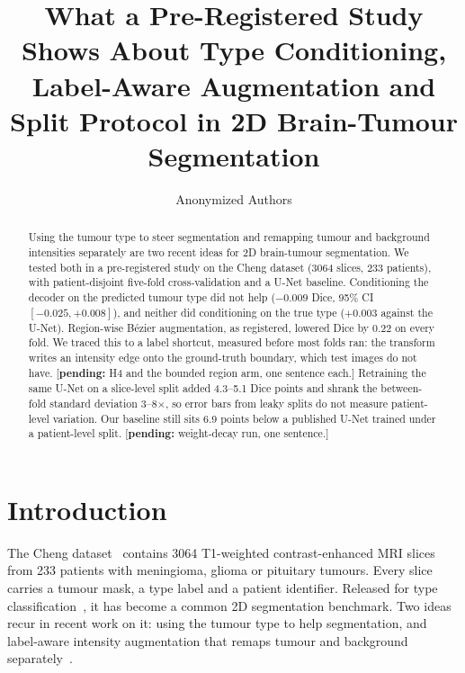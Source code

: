 \documentclass[runningheads]{llncs}
\newcommand{\pending}[1]{\textcolor{red!70!black}{[\textbf{pending:} #1]}}
\begin{document}
\title{What a Pre-Registered Study Shows About Type Conditioning,
Label-Aware Augmentation and Split Protocol in 2D Brain-Tumour Segmentation}
\author{Anonymized Authors}

\maketitle

\begin{abstract}
Using the tumour type to steer segmentation and remapping tumour and background
intensities separately are two recent ideas for 2D brain-tumour segmentation. We
tested both in a pre-registered study on the Cheng dataset (3064 slices, 233
patients), with patient-disjoint five-fold cross-validation and a U-Net baseline.
Conditioning the decoder on the predicted tumour type did not help ($-0.009$ Dice,
95\% CI $[-0.025,+0.008]$), and neither did conditioning on the true type
($+0.003$ against the U-Net). Region-wise B\'ezier augmentation, as registered,
lowered Dice by 0.22 on every fold. We traced this to a label shortcut, measured
before most folds ran: the transform writes an intensity edge onto the
ground-truth boundary, which test images do not have. \pending{H4 and the bounded
region arm, one sentence each.} Retraining the same U-Net on a slice-level split
added 4.3--5.1 Dice points and shrank the between-fold standard deviation
3--8$\times$, so error bars from leaky splits do not measure patient-level
variation. Our baseline still sits 6.9 points below a published U-Net trained
under a patient-level split. \pending{weight-decay run, one sentence.}
\end{abstract}

\section{Introduction}

The Cheng dataset~\cite{chengdata,cheng2015} contains 3064 T1-weighted
contrast-enhanced MRI slices from 233 patients with meningioma, glioma or
pituitary tumours. Every slice carries a tumour mask, a type label and a patient
identifier. Released for type classification~\cite{cheng2015}, it has become a
common 2D segmentation benchmark. Two ideas recur in recent work on it: using the
tumour type to help segmentation, and label-aware intensity augmentation that
remaps tumour and background separately~\cite{yurdakul2026}.
\end{document}
